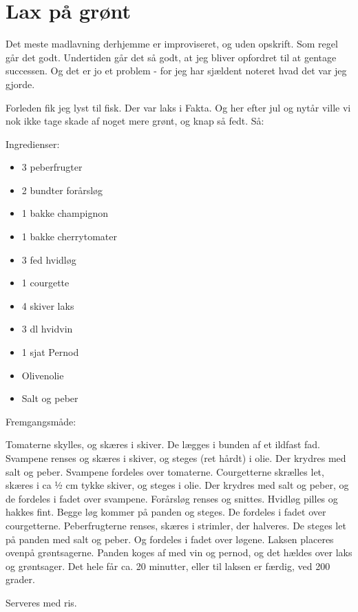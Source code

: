 \documentclass[
  letterpaper,
  DIV=11,
  numbers=noendperiod]{scrreprt}
\providecommand{\tightlist}{%
  \setlength{\itemsep}{0pt}\setlength{\parskip}{0pt}}\usepackage{longtable,booktabs,array}
\begin{document}
\hypertarget{lax-puxe5-gruxf8nt}{%
\section{Lax på grønt}\label{lax-puxe5-gruxf8nt}}

Det meste madlavning derhjemme er improviseret, og uden opskrift. Som
regel går det godt. Undertiden går det så godt, at jeg bliver opfordret
til at gentage successen. Og det er jo et problem - for jeg har sjældent
noteret hvad det var jeg gjorde.

Forleden fik jeg lyst til fisk. Der var laks i Fakta. Og her efter jul
og nytår ville vi nok ikke tage skade af noget mere grønt, og knap så
fedt. Så:

Ingredienser:

\begin{itemize}
\tightlist
\item
  3 peberfrugter
\item
  2 bundter forårsløg
\item
  1 bakke champignon
\item
  1 bakke cherrytomater
\item
  3 fed hvidløg
\item
  1 courgette
\item
  4 skiver laks
\item
  3 dl hvidvin
\item
  1 sjat Pernod
\item
  Olivenolie
\item
  Salt og peber
\end{itemize}

Fremgangsmåde:

Tomaterne skylles, og skæres i skiver. De lægges i bunden af et ildfast
fad. Svampene renses og skæres i skiver, og steges (ret hårdt) i olie.
Der krydres med salt og peber. Svampene fordeles over tomaterne.
Courgetterne skrælles let, skæres i ca ½ cm tykke skiver, og steges i
olie. Der krydres med salt og peber, og de fordeles i fadet over
svampene. Forårsløg renses og snittes. Hvidløg pilles og hakkes fint.
Begge løg kommer på panden og steges. De fordeles i fadet over
courgetterne. Peberfrugterne renses, skæres i strimler, der halveres. De
steges let på panden med salt og peber. Og fordeles i fadet over løgene.
Laksen placeres ovenpå grøntsagerne. Panden koges af med vin og pernod,
og det hældes over laks og grøntsager. Det hele får ca. 20 minutter,
eller til laksen er færdig, ved 200 grader.

Serveres med ris.
\end{document}
